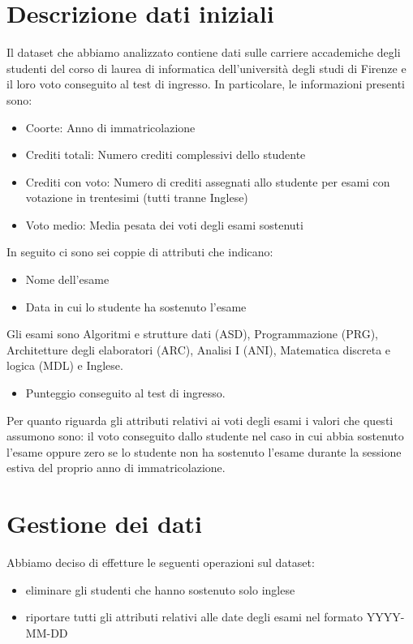 \documentclass[12pt]{article}
\begin{document}
\section{Descrizione dati iniziali}
Il dataset che abbiamo analizzato contiene dati sulle carriere accademiche degli studenti del corso di laurea di informatica dell'università degli studi di Firenze e il loro voto conseguito 
al test di ingresso. 
In particolare, le informazioni presenti sono:
\begin{itemize}
	\item Coorte: Anno di immatricolazione
	\item Crediti totali: Numero crediti complessivi dello studente
	\item Crediti con voto: Numero di crediti assegnati allo studente per esami con votazione in trentesimi (tutti tranne Inglese)
	\item Voto medio: Media pesata dei voti degli esami sostenuti
\end{itemize}
In seguito ci sono sei coppie di attributi che indicano:
\begin{itemize}
	\item Nome dell'esame
	\item Data in cui lo studente ha sostenuto l'esame
\end{itemize}
Gli esami sono Algoritmi e strutture dati (ASD), Programmazione (PRG), Architetture degli elaboratori (ARC), Analisi I (ANI), Matematica discreta e logica (MDL) e Inglese.
\begin{itemize}
	\item Punteggio conseguito al test di ingresso.
\end{itemize}
Per quanto riguarda gli attributi relativi ai voti degli esami i valori che questi assumono sono:
il voto conseguito dallo studente nel caso in cui abbia sostenuto l'esame oppure
zero se lo studente non ha sostenuto l'esa\-me durante la sessione estiva del proprio anno di immatricolazione.
\newpage
\section{Gestione dei dati}
Abbiamo deciso di effetture le seguenti operazioni sul dataset:
\begin{itemize}
	\item eliminare gli studenti che hanno sostenuto solo inglese
	\item riportare tutti gli attributi relativi alle date degli esami nel formato YYYY-MM-DD
\end{itemize}
\end{document}
